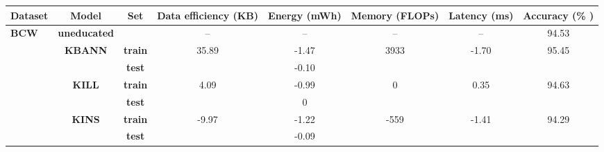 \begin{table}
    \centering
    \begin{adjustbox}{width=\linewidth,center}
        \begin{tabular}{l|c|c|c|c|c|c|c}
            \toprule
            \textbf{Dataset} & \textbf{Model} & \textbf{Set} & \textbf{Data efficiency (KB)} & \textbf{Energy (mWh)} & \textbf{Memory (FLOPs)} & \textbf{Latency (ms)} & \textbf{Accuracy (\%
            )}\\
            \midrule
            \multirow{7}{*}{\textbf{BCW}} & \textbf{uneducated} & & -- & -- & -- & -- & 94.53\\
            \cmidrule{2-8}

            & \multirow{2}{*}{\textbf{KBANN}} & \textbf{train} & \multirow{2}{*}{35.89} & -1.47 & \multirow{2}{*}{3933} & \multirow{2}{*}{-1.70} & \multirow{2}{*}{95.45}\\
            & & \textbf{test} & & -0.10 & &  & \\
            \cline{2-8}

            & \multirow{2}{*}{\textbf{KILL}} & \textbf{train} & \multirow{2}{*}{4.09} & -0.99 & \multirow{2}{*}{0} & \multirow{2}{*}{0.35} & \multirow{2}{*}{94.63}\\
            & & \textbf{test} & & 0 & & &\\
            \cline{2-8}

            & \multirow{2}{*}{\textbf{KINS}} & \textbf{train} & \multirow{2}{*}{-9.97} & -1.22 & \multirow{2}{*}{-559} & \multirow{2}{*}{-1.41} & \multirow{2}{*}{94.29}\\
            & & \textbf{test} & & -0.09 & &  & \\
            \midrule



\end{tabular}
\end{adjustbox}
\end{table}
